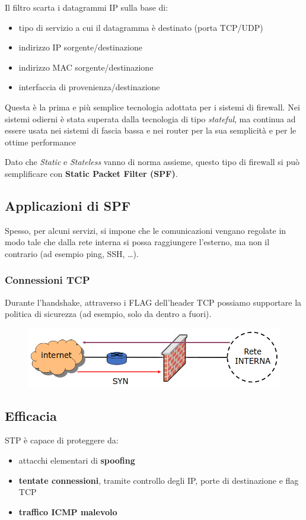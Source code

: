 \noindent Il filtro scarta i datagrammi IP sulla base di:
\begin{itemize}
    \item tipo di servizio a cui il datagramma è destinato (porta TCP/UDP)
    \item indirizzo IP sorgente/destinazione 
    \item indirizzo MAC sorgente/destinazione 
    \item interfaccia di provenienza/destinazione 
\end{itemize}

\noindent Questa è la prima e più semplice tecnologia adottata per i sistemi di 
firewall. Nei sistemi odierni è stata superata dalla tecnologia di tipo \textit{stateful}, ma continua
ad essere usata nei sistemi di fascia bassa e nei router per la sua semplicità e per 
le ottime performance

\noindent Dato che \textit{Static} e \textit{Stateless} vanno di norma assieme, questo tipo di firewall
si può semplificare con \textbf{Static Packet Filter (SPF)}.

\subsection{Applicazioni di SPF}
Spesso, per alcuni servizi, si impone che le comunicazioni vengano regolate in 
modo tale che dalla rete interna si possa raggiungere l'esterno, ma non il contrario (ad esempio ping, SSH, \dots).

\subsubsection{Connessioni TCP}
Durante l'handshake, attraverso i FLAG dell'header TCP possiamo supportare la politica 
di sicurezza (ad esempio, solo da dentro a fuori).

\begin{figure}[H]
    \centering
    \includegraphics[width=0.8\linewidth]{chapters/11/images/spt-tcp.png}
\end{figure}

\subsection{Efficacia}
STP è capace di proteggere da:
\begin{itemize}
    \item attacchi elementari di \textbf{spoofing}
    \item \textbf{tentate connessioni}, tramite controllo degli IP, porte di destinazione e flag TCP 
    \item \textbf{traffico ICMP malevolo}
\end{itemize}


